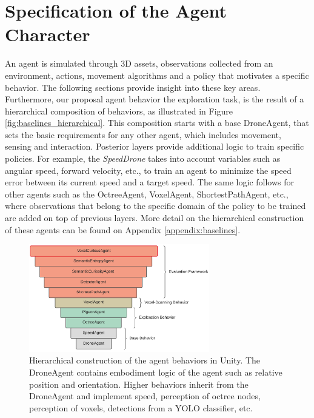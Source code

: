 
\section{Specification of the Agent Character}

An agent is simulated through 3D assets, observations collected from an environment, actions, movement algorithms and a policy that motivates a specific behavior. The following sections provide insight into these key areas.
Furthermore, our proposal agent behavior the exploration task, is the result of a hierarchical composition of behaviors, as illustrated in Figure \ref{fig:baselines_hierarchical}. This composition starts with a base DroneAgent, that sets the basic requirements for any other agent, which includes movement, sensing and interaction. Posterior layers provide additional logic to train specific policies. For example, the \textit{SpeedDrone} takes into account variables such as angular speed, forward velocity, etc., to train an agent to  minimize the speed error between its current speed and a target speed. The same logic follows for other agents such as the OctreeAgent, VoxelAgent, ShortestPathAgent, etc., where observations that belong to the specific domain of the policy to be trained are added on top of previous layers. More detail on the hierarchical construction of these agents can be found on Appendix \ref{appendix:baselines}.

\begin{figure}[!ht]
        \centering
        \includegraphics[width=0.7\textwidth]{images/baselines_hierarchical_construction.png}
        \caption{Hierarchical construction of the agent behaviors in Unity. The DroneAgent contains embodiment logic of the agent such as relative position and orientation. Higher behaviors inherit from the DroneAgent and implement speed, perception of octree nodes, perception of voxels, detections from a YOLO classifier, etc. 
        }
        \label{fig:bselines_hierarchical}
\end{figure}

